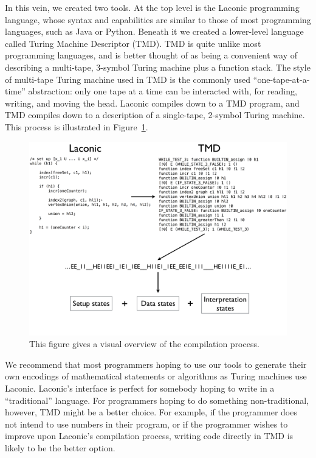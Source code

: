 \documentclass[11pt]{article}
\begin{document}
In this vein, we created two tools. At the top level is the Laconic programming language, whose syntax and capabilities are similar to those of most programming languages, such as Java or Python. Beneath it we created a lower-level language called Turing Machine Descriptor (TMD). TMD is quite unlike most programming languages, and is better thought of as being a convenient way of describing a multi-tape, 3-symbol Turing machine plus a function stack. The style of multi-tape Turing machine used in TMD is the commonly used ``one-tape-at-a-time'' abstraction: only one tape at a time can be interacted with, for reading, writing, and moving the head. Laconic compiles down to a TMD program, and TMD compiles down to a description of a single-tape, 2-symbol Turing machine. This process is illustrated in Figure~\ref{fig:compilation}. \\

\begin{figure} 
\begin{center} 
\includegraphics[scale=0.42]{figs/compilation.png}
\caption{This figure gives a visual overview of the compilation process. \label{fig:compilation}} 
\end{center} 
\end{figure}

We recommend that most programmers hoping to use our tools to generate their own encodings of mathematical statements or algorithms as Turing machines use Laconic. Laconic's interface is perfect for somebody hoping to write in a ``traditional'' language. For programmers hoping to do something non-traditional, however, TMD might be a better choice. For example, if the programmer does not intend to use numbers in their program, or if the programmer wishes to improve upon Laconic's compilation process, writing code directly in TMD is likely to be the better option.
\end{document}
